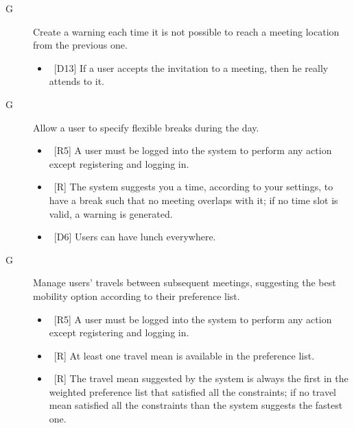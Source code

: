 \begin{description}
\item[G\thecountGoal] Create a warning each time it is not possible to reach a meeting location from the previous one.


\begin{itemize}
\item~[D13] If a user accepts the invitation to a meeting, then he really attends to it.
\end{itemize}

\item[G\thecountGoal] Allow a user to specify flexible breaks during the day.

\begin{itemize}
\item~[R5] A user must be logged into the system to perform any action except registering and logging in.
\item~[R\reqNum] The system suggests you a time, according to your settings, to have a break such that no meeting overlaps with it; if no time slot is valid, a warning is generated.
\end{itemize}

\begin{itemize}
\item~[D6] Users can have lunch everywhere.
\end{itemize}

\item[G\thecountGoal] Manage users’ travels between subsequent meetings, suggesting the best mobility option according to their preference list.

\begin{itemize}
\item~[R5] A user must be logged into the system to perform any action except registering and logging in.
\item~[R\reqNum] At least one travel mean is available in the preference list.
\item~[R\reqNum] The travel mean suggested by the system is always the first in the weighted preference list that satisfied all the constraints; if no travel mean satisfied all the constraints than the system suggests the fastest one.
\end{itemize}


\end{description}

